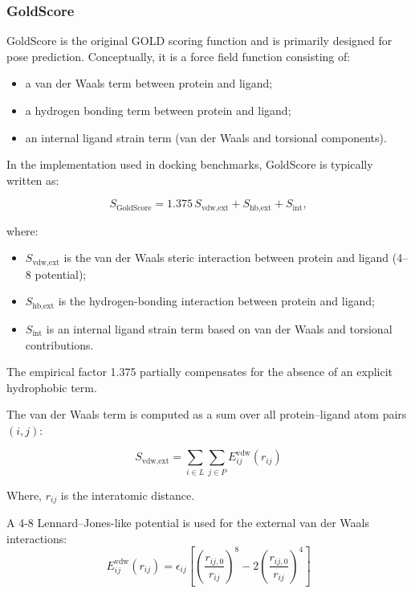 \documentclass[12pt]{article}
\begin{document}
\subsubsection{GoldScore}

GoldScore is the original GOLD scoring function and is primarily designed for pose prediction\cite{CH7_Jones1997}. Conceptually, it is a force field function consisting of:
\begin{itemize}
    \item a van der Waals term between protein and ligand;
    \item a hydrogen bonding term between protein and ligand;
    \item an internal ligand strain term (van der Waals and torsional components).
\end{itemize}

In the implementation used in docking benchmarks\cite{CH7_Wang2003_Suppl}, GoldScore is typically written as:

\begin{equation}
S_{\textrm{GoldScore}}
= 1.375\, S_{\textrm{vdw,ext}}
+ S_{\textrm{hb,ext}}
+ S_{\textrm{int}},
\label{eq:GoldScore}
\end{equation}

where:
\begin{itemize}
    \item $S_{\textrm{vdw,ext}}$ is the van der Waals steric interaction between protein and ligand (4--8 potential);
    \item $S_{\textrm{hb,ext}}$ is the hydrogen-bonding interaction between protein and ligand;
    \item $S_{\textrm{int}}$ is an internal ligand strain term based on van der Waals and torsional contributions.
\end{itemize}
The empirical factor 1.375 partially compensates for the absence of an explicit hydrophobic term\cite{CH7_Wang2003_Suppl}.

The van der Waals term is computed as a sum over all protein–ligand atom pairs $(i,j)$:

\begin{equation}
S_{\textrm{vdw,ext}}
= \sum_{i \in L}\sum_{j \in P}
E^{\textrm{vdw}}_{ij}(r_{ij})
\end{equation}

Where,
$r_{ij}$ is the interatomic distance. 

A 4-8 Lennard–Jones-like potential is used for the external van der Waals interactions:
\begin{equation}
E^{\textrm{vdw}}_{ij}(r_{ij})
= \epsilon_{ij}
\left[
\left(\frac{r_{ij,0}}{r_{ij}}\right)^{8}
-
2\left(\frac{r_{ij,0}}{r_{ij}}\right)^{4}
\right]
\end{equation}
\end{document}
